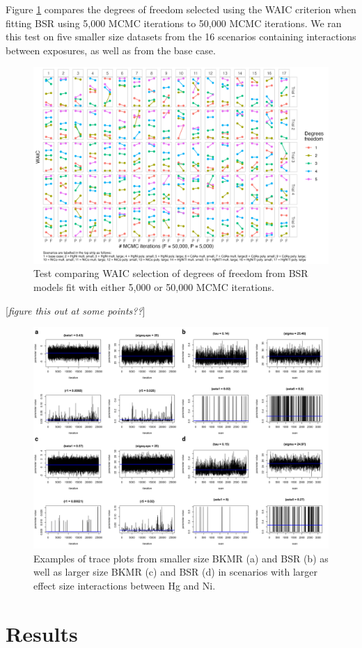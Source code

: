 \documentclass[12pt, twoside]{amherstthesis}
\begin{document}
Figure \ref{fig:comparedf} compares the degrees of freedom selected using the WAIC criterion when fitting BSR using 5,000 MCMC iterations to 50,000 MCMC iterations. We ran this test on five smaller size datasets from the 16 scenarios containing interactions between exposures, as well as from the base case.
\begin{figure}

{\centering \includegraphics[width=1\linewidth]{figures/test_waic2} 

}

\caption{Test comparing WAIC selection of degrees of freedom from BSR models fit with either 5,000 or 50,000 MCMC iterations.}\label{fig:comparedf}
\end{figure}
{[}\emph{figure this out at some points??}{]}
\begin{figure}

{\centering \includegraphics[width=1\linewidth]{figures/traceplots/bksm_traceplotmerged} 

}

\caption{Examples of trace plots from smaller size BKMR (a) and BSR (b) as well as larger size BKMR (c) and BSR (d) in scenarios with larger effect size interactions between Hg and Ni.}\label{fig:traceplots}
\end{figure}
\hypertarget{suppresults}{%
\section{Results}\label{suppresults}}
\end{document}
